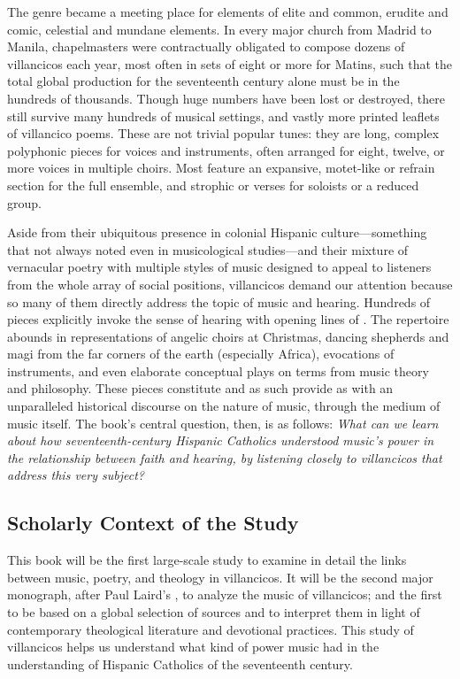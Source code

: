 \documentclass[tt]{vcbook-proposal}
\begin{document}
The genre became a meeting place for elements of elite and common, erudite and comic, celestial and mundane elements.
In every major church from Madrid to Manila, chapelmasters were contractually obligated to compose dozens of villancicos each year, most often in sets of eight or more for Matins, such that the total global production for the seventeenth century alone must be in the hundreds of thousands.
Though huge numbers have been lost or destroyed, there still survive many hundreds of musical settings, and vastly more printed leaflets of villancico poems. 
These are not trivial popular tunes: they are long, complex polyphonic pieces for voices and instruments, often arranged for eight, twelve, or more voices in multiple choirs.
Most feature an expansive, motet-like  or refrain section for the full ensemble, and strophic  or verses for soloists or a reduced group.

Aside from their ubiquitous presence in colonial Hispanic culture---something that not always noted even in musicological studies---and their mixture of vernacular poetry with multiple styles of music designed to appeal to listeners from the whole array of social positions, villancicos demand our attention because so many of them directly address the topic of music and hearing.
Hundreds of pieces explicitly invoke the sense of hearing with opening lines of   .
The repertoire abounds in representations of angelic choirs at Christmas, dancing shepherds and magi from the far corners of the earth (especially Africa), evocations of instruments, and even elaborate conceptual plays on terms from music theory and philosophy.
These pieces constitute  and as such provide as with an unparalleled historical discourse on the nature of music, through the medium of music itself.
The book's central question, then, is as follows: 
\emph{What can we learn about how seventeenth-century Hispanic Catholics understood music's power in the relationship between faith and hearing, by listening closely to villancicos that address this very subject?}

\subsection{Scholarly Context of the Study}

This book will be the first large-scale study to examine in detail the links between music, poetry, and theology in villancicos.
It will be the second major monograph, after Paul Laird's , to analyze the music of villancicos; and the first to be based on a global selection of sources and to interpret them in light of contemporary theological literature and devotional practices.
This study of villancicos helps us understand what kind of power music had in the understanding of Hispanic Catholics of the seventeenth century.
\end{document}
